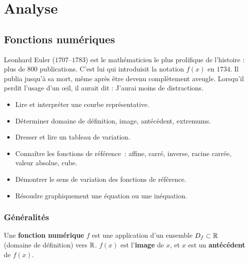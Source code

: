 \part{Analyse}

\chapter{Fonctions num\'eriques}


\begin{anecdote}
Leonhard Euler ($1707$--$1783$) est le math\'ematicien le plus prolifique
de l'histoire : plus de $800$ publications. C'est lui qui introduisit la
notation $f(x)$ en $1734$. Il publia jusqu'\`a sa mort, m\^{e}me apr\`es \^{e}tre
devenu compl\`etement aveugle. Lorsqu'il perdit l'usage d'un \oe il, il aurait
dit : \og J'aurai moins de distractions.\fg
\end{anecdote}

\begin{objectifs}
\begin{itemize}
  \item Lire et interpr\'eter une courbe repr\'esentative.
  \item D\'eterminer domaine de d\'efinition, image, ant\'ec\'edent, extremums.
  \item Dresser et lire un tableau de variation.
  \item Conna\^itre les fonctions de r\'ef\'erence~: affine, carr\'e, inverse, racine carr\'ee, valeur absolue, cube.
  \item D\'emontrer le sens de variation des fonctions de r\'ef\'erence.
  \item R\'esoudre graphiquement une \'equation ou une in\'equation.
\end{itemize}
\end{objectifs}

\section{G\'en\'eralit\'es}

\begin{defn}
Une \textbf{fonction num\'erique} $f$ est une application d'un ensemble $D_f \subset \mathbb{R}$
(domaine de d\'efinition) vers $\mathbb{R}$. $f(x)$ est l'\textbf{image} de $x$,
et $x$ est un \textbf{ant\'ec\'edent} de $f(x)$.
\end{defn}

